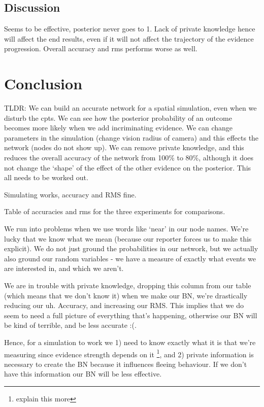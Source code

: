 \subsection{Discussion}

Seems to be effective, posterior never goes to 1. Lack of private knowledge hence will affect the end results, even if it will not affect the trajectory of the evidence progression. Overall accuracy and rms performs worse as well.


\section{Conclusion}


{\color{blue} TLDR: We can build an accurate network for a spatial simulation, even when we disturb the cpts. We can see how the posterior probability of an outcome becomes more likely when we add incriminating evidence. We can change parameters in the simulation (change vision radius of camera) and this effects the network (nodes do not show up). We can remove private knowledge, and this reduces the overall accuracy of the network from 100\% to 80\%, although it does not change the `shape' of the effect of the other evidence on the posterior. This all needs to be worked out.}


Simulating works, accuracy and RMS fine.

Table of accuracies and rms for the three experiments for comparisons.

We run into problems when we use words like `near' in our node names. We're lucky that we know what we mean (because our reporter forces us to make this explicit). We do not just ground the probabilities in our network, but we actually also ground our random variables - we have a measure of exactly what events we are interested in, and which we aren't.

We are in trouble with private knowledge, dropping this column from our table (which means that we don't know it) when we make our BN, we're drastically reducing our uh. Accuracy, and increasing our RMS. This implies that we do seem to need a full picture of everything that's happening, otherwise our BN will be kind of terrible, and be less accurate :(.

Hence, for a simulation to work we 1) need to know exactly what it is that we're measuring since evidence strength depends on it \footnote{explain this more}, and 2) private information is necessary to create the BN because it influences fleeing behaviour. If we don't have this information our BN will be less effective.


